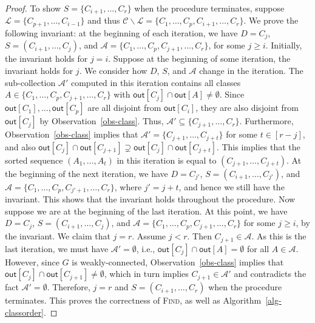 \begin{proof}
To show $S = \{C_{i+1},\dots,C_r\}$ when the procedure terminates, suppose $\mathcal{L} = \{C_{p+1},\dots,C_{i-1}\}$ and thus $\mathcal{C} \backslash \mathcal{L} = \{C_1,\dots,C_p,C_{i+1},\dots,C_r\}$.
We prove the following invariant: at the beginning of each iteration, we have $D = C_j$, $S = (C_{i+1},\dots,C_j)$, and $\mathcal{A} = \{C_1,\dots,C_p,C_{j+1},\dots,C_r\}$, for some $j \geq i$.
Initially, the invariant holds for $j = i$.
Suppose at the beginning of some iteration, the invariant holds for $j$.
We consider how $D$, $S$, and $\mathcal{A}$ change in the iteration.
The sub-collection $\mathcal{A}'$ computed in this iteration contains all classes $A \in \{C_1,\dots,C_p,C_{j+1},\dots,C_r\}$ with $\mathsf{out}[C_j] \cap \mathsf{out}[A] \neq \emptyset$.
Since $\mathsf{out}[C_1],\dots,\mathsf{out}[C_p]$ are all disjoint from $\mathsf{out}[C_i]$, they are also disjoint from $\mathsf{out}[C_j]$ by Observation~\ref{obs-class}.
Thus, $\mathcal{A}' \subseteq \{C_{j+1},\dots,C_r\}$.
Furthermore, Observation~\ref{obs-class} implies that $\mathcal{A}' = \{C_{j+1},\dots,C_{j+t}\}$ for some $t \in [r-j]$, and also $\mathsf{out}[C_j] \cap \mathsf{out}[C_{j+1}] \supsetneq \mathsf{out}[C_j] \cap \mathsf{out}[C_{j+t}]$.
This implies that the sorted sequence $(A_1,\dots,A_t)$ in this iteration is equal to $(C_{j+1},\dots,C_{j+t})$.
At the beginning of the next iteration, we have $D = C_{j'}$, $S = (C_{i+1},\dots,C_{j'})$, and $\mathcal{A} = \{C_1,\dots,C_p,C_{j'+1},\dots,C_r\}$, where $j' = j+t$, and hence we still have the invariant.
This shows that the invariant holds throughout the procedure.
Now suppose we are at the beginning of the last iteration.
At this point, we have $D = C_j$, $S = (C_{i+1},\dots,C_j)$, and $\mathcal{A} = \{C_1,\dots,C_p,C_{j+1},\dots,C_r\}$ for some $j \geq i$, by the invariant.
We claim that $j = r$.
Assume $j < r$.
Then $C_{j+1} \in \mathcal{A}$.
As this is the last iteration, we must have $\mathcal{A}' = \emptyset$, i.e., $\mathsf{out}[C_j] \cap \mathsf{out}[A] = \emptyset$ for all $A \in \mathcal{A}$.
However, since $G$ is weakly-connected, Observation~\ref{obs-class} implies that $\mathsf{out}[C_j] \cap \mathsf{out}[C_{j+1}] \neq \emptyset$, which in turn implies $C_{j+1} \in \mathcal{A}'$ and contradicts the fact $\mathcal{A}' = \emptyset$.
Therefore, $j = r$ and $S = (C_{i+1},\dots,C_r)$ when the procedure terminates.
This proves the correctness of \textsc{Find}, as well as Algorithm~\ref{alg-classorder}.


\end{proof}
